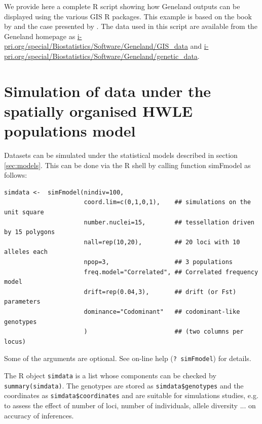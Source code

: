 \documentclass{article}
\begin{document}
We  provide here a complete R script showing how Geneland outputs can be displayed using the various GIS 
R packages. This example is based on the book by \citet{Bivand08} and the case presented by \citet{Hille12}. 
The data used in this script are available from the Geneland homepage as 
\url{i-pri.org/special/Biostatistics/Software/Geneland/GIS_data} and \url{i-pri.org/special/Biostatistics/Software/Geneland/genetic_data}.


%
\clearpage


\clearpage
\section{Simulation of data under the spatially organised HWLE populations model}\label{sim-HWLE}

Datasets can be simulated under the statistical models described in section \ref{sec:models}. 
This can be done via the R shell by calling function simFmodel as follows:

\begin{verbatim}
simdata <-  simFmodel(nindiv=100,
                      coord.lim=c(0,1,0,1),    ## simulations on the unit square
                      number.nuclei=15,        ## tessellation driven by 15 polygons
                      nall=rep(10,20),         ## 20 loci with 10 alleles each
                      npop=3,                  ## 3 populations
                      freq.model="Correlated", ## Correlated frequency model 
                      drift=rep(0.04,3),       ## drift (or Fst) parameters
                      dominance="Codominant"   ## codominant-like genotypes 
                      )                        ## (two columns per locus)
\end{verbatim}



Some of the arguments are optional. See on-line help (\texttt{? simFmodel}) for details.

The R object \texttt{simdata} is a list whose components can be checked by \texttt{summary(simdata)}. 
The genotypes are stored as \texttt{simdata\$genotypes} and the coordinates as \texttt{simdata\$coordinates} 
and are suitable for simulations studies, e.g. to assess the effect of number of loci, number of individuals, allele diversity ...
on accuracy of inferences. 
\end{document}
